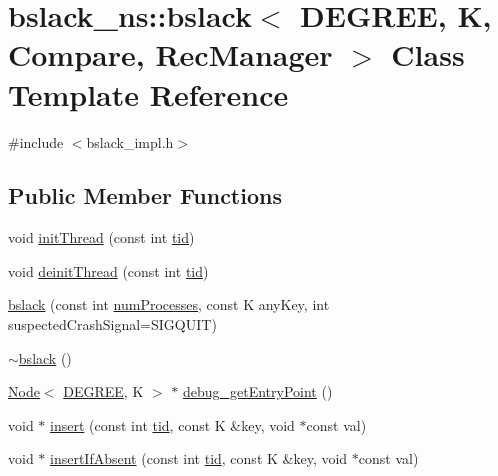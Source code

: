 \hypertarget{classbslack__ns_1_1bslack}{}\section{bslack\+\_\+ns\+:\+:bslack$<$ D\+E\+G\+R\+EE, K, Compare, Rec\+Manager $>$ Class Template Reference}
\label{classbslack__ns_1_1bslack}


{\ttfamily \#include $<$bslack\+\_\+impl.\+h$>$}

\subsection*{Public Member Functions}
\begin{DoxyCompactItemize}
\item 
void \hyperlink{classbslack__ns_1_1bslack_a1fafbe3eb053883706fb6b93ef1fe01e}{init\+Thread} (const int \hyperlink{microbench_2main_8cpp_a9ca9869868fe7e7a38a921cc7de4103f}{tid})
\item 
void \hyperlink{classbslack__ns_1_1bslack_a530a1fb09e721e94b1b8e09be76bc2cd}{deinit\+Thread} (const int \hyperlink{microbench_2main_8cpp_a9ca9869868fe7e7a38a921cc7de4103f}{tid})
\item 
\hyperlink{classbslack__ns_1_1bslack_ab563f1ab8920fa875eae3742731ca082}{bslack} (const int \hyperlink{testing_8cpp_aa085812188e21ede75351d88b9b2c30d}{num\+Processes}, const K any\+Key, int suspected\+Crash\+Signal=S\+I\+G\+Q\+U\+IT)
\item 
\hyperlink{classbslack__ns_1_1bslack_a2714697604a83024eebc713ba691fbaf}{$\sim$bslack} ()
\item 
\hyperlink{structbslack__ns_1_1Node}{Node}$<$ \hyperlink{brown__sigouin__abtree__kcas_2adapter_8h_a5d88b17d70c985f2f2b8e987037fd6dd}{D\+E\+G\+R\+EE}, K $>$ $\ast$ \hyperlink{classbslack__ns_1_1bslack_a86f277752d6bb5cf8eaf462353a2ae51}{debug\+\_\+get\+Entry\+Point} ()
\item 
void $\ast$ \hyperlink{classbslack__ns_1_1bslack_a2ec4a46e691585ca87b6cb7410b9adf4}{insert} (const int \hyperlink{microbench_2main_8cpp_a9ca9869868fe7e7a38a921cc7de4103f}{tid}, const K \&key, void $\ast$const val)
\item 
void $\ast$ \hyperlink{classbslack__ns_1_1bslack_ae62b610f3793dc107e60d54b889771bb}{insert\+If\+Absent} (const int \hyperlink{microbench_2main_8cpp_a9ca9869868fe7e7a38a921cc7de4103f}{tid}, const K \&key, void $\ast$const val)

\end{DoxyCompactItemize}
